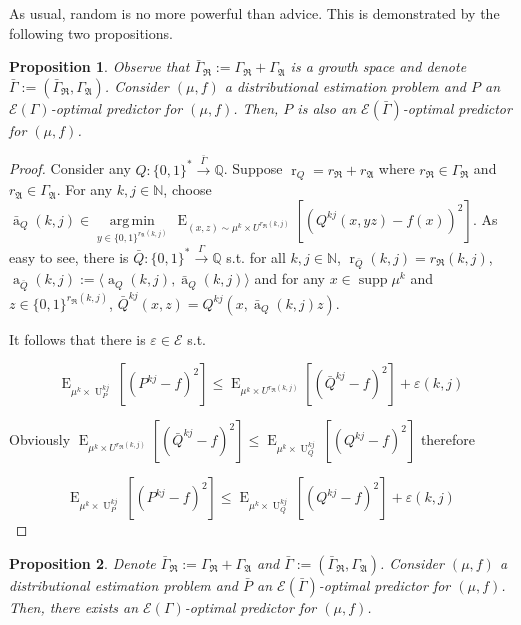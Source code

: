 \documentclass{article}
\numberwithin{equation}{section}
\theoremstyle{definition}
\theoremstyle{plain}
\newtheorem{proposition}{Proposition}[section]
\newcommand{\Bool}{\{0,1\}}
\newcommand{\Words}{{\Bool^*}}
\newcommand{\WordsLen}[1]{{\Bool^{#1}}}
\DeclareMathOperator{\Supp}{supp}
\DeclareMathOperator{\E}{E}
\DeclareMathOperator{\R}{r}
\DeclareMathOperator{\A}{a}
\DeclareMathOperator{\U}{U}
\newcommand{\Argmin}[1]{\underset{#1}{\operatorname{arg\,min}}\,}
\newcommand{\Nats}{\mathbb{N}}
\newcommand{\Rats}{\mathbb{Q}}
\newcommand{\Chev}[1]{\langle #1 \rangle}
\newcommand{\GrowR}{\Gamma_{\mathfrak{R}}}
\newcommand{\GrowA}{\Gamma_{\mathfrak{A}}}
\newcommand{\Fall}{\mathcal{E}}
\newcommand{\Scheme}{\xrightarrow{\Gamma}}
\begin{document}
As usual, random is no more powerful than advice. This is demonstrated by the following two propositions.

\begin{proposition}

Observe that $\bar{\Gamma}_{\mathfrak{R}}:=\GrowR+\GrowA$ is a growth space and denote $\bar{\Gamma}:=(\bar{\Gamma}_{\mathfrak{R}},\GrowA)$. Consider $(\mu,f)$ a distributional estimation problem and $P$ an $\Fall(\Gamma)$-optimal predictor for $(\mu,f)$. Then, $P$ is also an $\Fall(\bar{\Gamma})$-optimal predictor for $(\mu,f)$.

\end{proposition}

\begin{proof}

Consider any $Q: \Words \xrightarrow{\bar{\Gamma}} \Rats$. Suppose $\R_Q=r_{\mathfrak{R}}+r_{\mathfrak{A}}$ where $r_{\mathfrak{R}} \in \GrowR$ and $r_{\mathfrak{A}} \in \GrowA$. For any $k,j \in \Nats$, choose ${\bar{\A}_Q(k,j) \in \Argmin{y \in \WordsLen{r_{\mathfrak{A}}(k,j)}} \E_{(x,z) \sim \mu^k \times U^{r_{\mathfrak{R}}(k,j)}}[(Q^{kj}(x,yz) - f(x))^2]}$. As easy to see, there is $\bar{Q}: \Words \Scheme \Rats$ s.t. for all $k,j \in \Nats$, $\R_{\bar{Q}}(k,j) = r_{\mathfrak{R}}(k,j)$, $\A_{\bar{Q}}(k,j):=\Chev{\A_Q(k,j),\bar{\A}_Q(k,j)}$ and for any $x \in \Supp \mu^k$ and $z \in \WordsLen{r_{\mathfrak{R}}(k,j)}$, ${\bar{Q}^{kj}(x,z)=Q^{kj}(x,\bar{\A}_Q(k,j)z)}$.

It follows that there is $\varepsilon \in \Fall$ s.t.

$$\E_{\mu^k \times \U_P^{kj}}[(P^{kj} - f)^2] \leq \E_{\mu^k \times U^{r_{\mathfrak{R}}(k,j)}}[(\bar{Q}^{kj} - f)^2] + \varepsilon(k,j)$$

Obviously $\E_{\mu^k \times U^{r_{\mathfrak{R}}(k,j)}}[(\bar{Q}^{kj} - f)^2] \leq \E_{\mu^k \times \U_Q^{kj}}[(Q^{kj} - f)^2]$ therefore

$$\E_{\mu^k \times \U_P^{kj}}[(P^{kj} - f)^2] \leq \E_{\mu^k \times \U_Q^{kj}}[(Q^{kj} - f)^2] + \varepsilon(k,j)$$

\end{proof}

\begin{proposition}

Denote $\bar{\Gamma}_{\mathfrak{R}}:=\GrowR+\GrowA$ and $\bar{\Gamma}:=(\bar{\Gamma}_{\mathfrak{R}},\GrowA)$. Consider $(\mu,f)$ a distributional estimation problem and $\bar{P}$ an $\Fall(\bar{\Gamma})$-optimal predictor for $(\mu,f)$. Then, there exists an $\Fall(\Gamma)$-optimal predictor for $(\mu,f)$.

\end{proposition}
\end{document}
